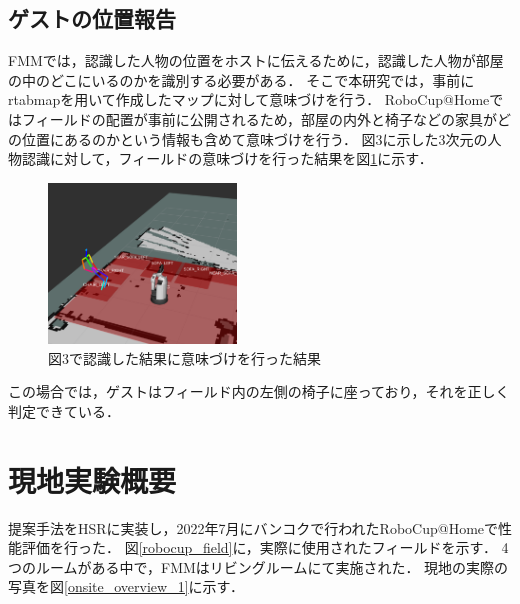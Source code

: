\documentclass[a4j]{jarticle}
\begin{document}
\subsection{ゲストの位置報告}
FMMでは，認識した人物の位置をホストに伝えるために，認識した人物が部屋の中のどこにいるのかを識別する必要がある．
そこで本研究では，事前にrtabmap\cite{rtabmap}を用いて作成したマップに対して意味づけを行う．
RoboCup@Homeではフィールドの配置が事前に公開されるため，部屋の内外と椅子などの家具がどの位置にあるのかという情報も含めて意味づけを行う．
図3に示した3次元の人物認識に対して，フィールドの意味づけを行った結果を図\ref{human_where_map}に示す．
\begin{figure}[t]
  \centering
  \includegraphics[width=5cm]{images/human_recognition/ss_5_trim.png}
  \caption{図3で認識した結果に意味づけを行った結果}
  \label{human_where_map}
\end{figure}
この場合では，ゲストはフィールド内の左側の椅子に座っており，それを正しく判定できている．


\section{現地実験概要}
提案手法をHSRに実装し，2022年7月にバンコクで行われたRoboCup@Homeで性能評価を行った．
図\ref{robocup_field}に，実際に使用されたフィールドを示す．
4つのルームがある中で，FMMはリビングルームにて実施された．
現地の実際の写真を図\ref{onsite_overview_1}に示す．
\end{document}
